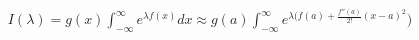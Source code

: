 \documentclass[preview]{standalone}
\begin{document}
\begin{align*}
I(\lambda) = \displaystyle g(x) \int_{-\infty}^{\infty} e^{\lambda f(x)} dx \approx g(a) \int_{-\infty}^{\infty} e^{\lambda (f(a) + \frac{f''(a)}{2!}(x - a)^2})
\end{align*}
\end{document}
